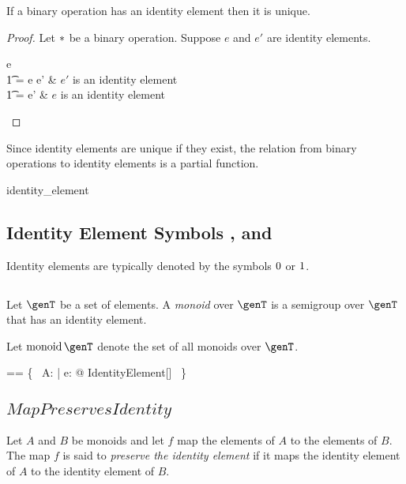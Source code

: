 \documentclass{amsart}
\begin{document}
\begin{remark}
If a binary operation has an identity element then it is unique.
\end{remark}

\begin{proof}
Let $\mathbin{*}$ be a binary operation. Suppose $e$ and $e'$ are identity elements.
\begin{argue}
e \\
\t1	= e \mulG e'	& $e'$ is an identity element \\
\t1	= e'			& $e$ is an identity element
\end{argue}
\end{proof}

\begin{remark}
Since identity elements are unique if they exist, the relation from binary operations to identity elements is a partial function.

\begin{zed}
identity\_element \in \binop \setT \pfun \setT
\end{zed}

\end{remark}


\subsection{Identity Element Symbols , and }

Identity elements are typically denoted by the symbols  $0$ or $1$.

\subsection{}

Let $\genT$ be a set of elements.
A {\em monoid} over $\genT$ is a semigroup over $\genT$ that has an identity element.

Let $\monoid \genT$ denote the set of all monoids over $\genT$.

\begin{zed}
\monoid \genT == \{~ A: \semigroup \genT | \exists e: \genT @ IdentityElement[\genT] ~\}
\end{zed}


\subsection{$MapPreservesIdentity$}

Let $A$ and $B$ be monoids and let $f$ map the elements of $A$ to the elements of $B$.
The map $f$ is said to {\em preserve the identity element} if it maps the identity element of $A$
to the identity element of $B$.
\end{document}
